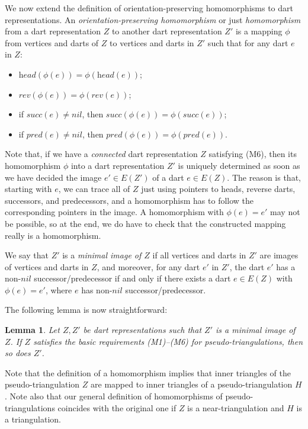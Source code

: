 \documentclass[10pt,a4paper]{article}
\newtheorem{lem}[thm]{Lemma}
\def\nil{\textit{nil}}
\def\head{\textit{head}}
\def\reverse{\textit{rev}}
\def\successor{\textit{succ}}
\def\predecessor{\textit{pred}}
\begin{document}
We now extend the definition of orientation-preserving homomorphisms to dart representations. 
An \emph{orientation-preserving homomorphism} or just \emph{homomorphism} from a 
dart representation $Z$ to another dart representation $Z'$ is a mapping $\phi$ from vertices and darts of $Z$ to vertices and darts in $Z'$ such that for any dart $e$ in $Z$:
\begin{itemize}
\item $\head(\phi(e))=\phi(\head(e))$;
\item $\reverse(\phi(e))=\phi(\reverse(e))$;
\item if $\successor(e)\neq\nil$, then $\successor(\phi(e))=\phi(\successor(e))$;
\item if $\predecessor(e)\neq\nil$, then $\predecessor(\phi(e))=\phi(\predecessor(e))$.
\end{itemize}
Note that, if we have a \emph{connected} dart representation $Z$ satisfying (M6), then its homomorphism $\phi$ into a dart representation $Z'$ is uniquely determined as soon as we have decided the image $e'\in E(Z')$ of a dart $e\in E(Z)$. The reason is that, starting with $e$, we can trace all of $Z$ just using pointers to heads, reverse darts, successors, and predecessors, and a homomorphism has to follow the corresponding pointers in the image. A homomorphism with $\phi(e)=e'$ may not be possible, so at the end, we do have to check that the constructed mapping really is a homomorphism.

We say that $Z'$ is a \emph{minimal image of $Z$} if
all vertices and darts in $Z'$ are images of vertices and darts in $Z$, and moreover, for any dart $e'$ in $Z'$, the dart $e'$ has a non-$\nil$ successor/predecessor if and only if there exists a dart $e\in E(Z)$ with $\phi(e)=e'$, where 
$e$ has non-$\nil$ successor/predecessor.

The following lemma is now straightforward:


\begin{lem}\label{lem:hom-basics}
    Let $Z,Z'$ be dart representations such that $Z'$ is a minimal image of $Z$. If $Z$ satisfies the basic requirements (M1)--(M6) for pseudo-triangulations, then so does $Z'$.
\end{lem}


Note that the definition of a homomorphism implies that inner triangles of the pseudo-triangulation $Z$ are mapped to inner triangles of a pseudo-triangulation $H$. Note also that our general definition of homomorphisms of pseudo-triangulations coincides with the original one if $Z$ is a near-triangulation and $H$ is a triangulation.
\end{document}
